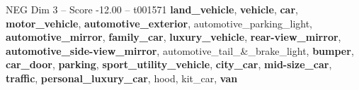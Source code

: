 \begin{textsample}{NEG Dim 3 – Score -12.00 – t001571}  \label{ex:f3_neg_006}
\textbf{land\_vehicle}, \textbf{vehicle}, \textbf{car}, \textbf{motor\_vehicle}, \textbf{automotive\_exterior}, automotive\_parking\_light, \textbf{automotive\_mirror}, \textbf{family\_car}, \textbf{luxury\_vehicle}, \textbf{rear-view\_mirror}, \textbf{automotive\_side-view\_mirror}, automotive\_tail\_\&\_brake\_light, \textbf{bumper}, \textbf{car\_door}, \textbf{parking}, \textbf{sport\_utility\_vehicle}, \textbf{city\_car}, \textbf{mid-size\_car}, \textbf{traffic}, \textbf{personal\_luxury\_car}, hood, kit\_car, \textbf{van}

\end{textsample}
